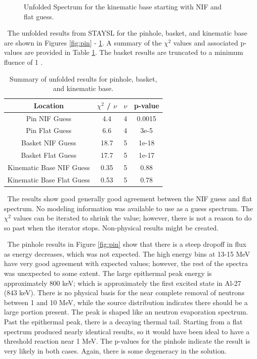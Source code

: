 \documentclass[journal]{IEEEtran}
\let\MYoriglatexcaption\caption
\renewcommand{\caption}[2][\relax]{\MYoriglatexcaption[#2]{#2}}
\begin{document}
\begin{figure}[t!]
		\caption{Unfolded Spectrum for the kinematic base starting with NIF and flat guess.}
		\label{fig:kbas}
		
	\end{figure}
	\ The unfolded results from STAYSL for the pinhole, basket, and kinematic base are shown in Figures \ref{fig:pin} - \ref{fig:kbas}. A summary of the $\chi^{2}$ values and associated p-values are provided in Table \ref{Table:STAY}. The basket results are truncated to a minimum fluence of 1 . 
	
	\begin{table}[h]
		\caption{Summary of unfolded results for pinhole, basket, and kinematic base.}
		\label{Table:STAY}
		\centering
		\begin{tabular}{|c|c|c|c|}
			\hline
			Location & $\chi^{2}$ / $\nu$ & $\nu$ & p-value \\ \hline
			Pin NIF Guess & 4.4 & 4 & 0.0015 \\ \hline
			Pin Flat Guess & 6.6 & 4 & 3e-5 \\ \hline
			Basket NIF Guess & 18.7 & 5 & 1e-18 \\ \hline
			Basket Flat Guess & 17.7 & 5 & 1e-17 \\ \hline
			Kinematic Base NIF Guess & 0.35 & 5 & 0.88 \\ \hline
			Kinematic Base Flat Guess & 0.53 & 5 & 0.78 \\ \hline
		\end{tabular}
	\end{table}
	
	\ The results show good generally good agreement between the NIF guess and flat spectrum. No modeling information was available to use as a guess spectrum. The $\chi^{2}$ values can be iterated to shrink the value; however, there is not a reason to do so past when the iterator stops. Non-physical results might be created. 
	
	\ The pinhole results in Figure \ref{fig:pin} show that there is a steep dropoff in flux as energy decreases, which was not expected. The high energy bins at 13-15 MeV have very good agreement with expected values; however, the rest of the spectra was unexpected to some extent. The large epithermal peak energy is approximately 800 keV; which is approximately the first excited state in Al-27 (843 keV). There is no physical basis for the near complete removal of neutrons between 1 and 10 MeV, while the source distribution indicates there should be a large portion present. The peak is shaped like an neutron evaporation spectrum. Past the epithermal peak, there is a decaying thermal tail. Starting from a flat spectrum produced nearly identical results, so it would have been ideal to have a threshold reaction near 1 MeV. The p-values for the pinhole indicate the result is very likely in both cases. Again, there is some degeneracy in the solution. 
	
\end{document}
